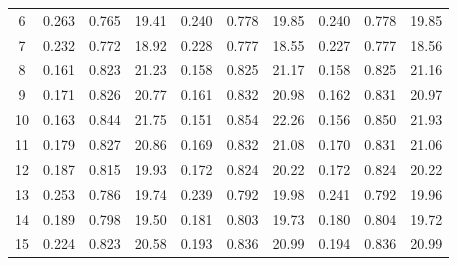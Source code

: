 \begin{table}[ht]
\begin{tabular}{@{}c|ccc|ccc|ccc@{}}
6                                  & 0.263                     & 0.765                     & 19.41     & 0.240                      & 0.778                     & 19.85    & 0.240                     & 0.778                     & 19.85     \\
7                                  & 0.232                     & 0.772                     & 18.92     & 0.228                      & 0.777                     & 18.55    & 0.227                     & 0.777                     & 18.56     \\
8                                  & 0.161                     & 0.823                     & 21.23     & 0.158                      & 0.825                     & 21.17    & 0.158                     & 0.825                     & 21.16     \\
9                                  & 0.171                     & 0.826                     & 20.77     & 0.161                      & 0.832                     & 20.98    & 0.162                     & 0.831                     & 20.97     \\
10                                 & 0.163                     & 0.844                     & 21.75     & 0.151                      & 0.854                     & 22.26    & 0.156                     & 0.850                     & 21.93     \\
11                                 & 0.179                     & 0.827                     & 20.86     & 0.169                      & 0.832                     & 21.08    & 0.170                     & 0.831                     & 21.06     \\
12                                 & 0.187                     & 0.815                     & 19.93     & 0.172                      & 0.824                     & 20.22    & 0.172                     & 0.824                     & 20.22     \\
13                                 & 0.253                     & 0.786                     & 19.74     & 0.239                      & 0.792                     & 19.98    & 0.241                     & 0.792                     & 19.96     \\
14                                 & 0.189                     & 0.798                     & 19.50     & 0.181                      & 0.803                     & 19.73    & 0.180                     & 0.804                     & 19.72     \\
15                                 & 0.224                     & 0.823                     & 20.58     & 0.193                      & 0.836                     & 20.99    & 0.194                     & 0.836                     & 20.99     \\

\end{tabular}
\end{table}
